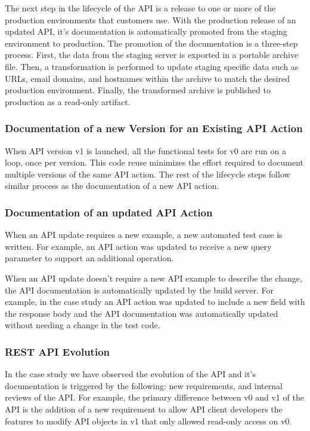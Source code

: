 \documentclass[10pt, conference]{IEEEtran}
\begin{document}
The next step in the lifecycle of the API is a release to one or more of the production environments that customers use. With the production release of an updated API, it's documentation is automatically promoted from the staging environment to production. The promotion of the documentation is a three-step process. First, the data from the staging server is exported in a portable archive file. Then, a transformation is performed to update staging specific data such as URLs, email domains, and hostnames within the archive to match the desired production environment. Finally, the transformed archive is published to production as a read-only artifact.


\subsubsection{Documentation of a new Version for an Existing API Action}

When API version v1 is launched, all the functional tests for v0 are run on a loop, once per version. This code reuse minimizes the effort required to document multiple versions of the same API action. The rest of the lifecycle steps follow similar process as the documentation of a new API action.

\subsubsection{Documentation of an updated API Action}
When an API update requires a new example, a new automated test case is written. For example, an API action was updated to receive a new query parameter to support an additional operation.

When an API update doesn't require a new API example to describe the change, the API documentation is automatically updated by the build server. For example, in the case study an API action was updated to include a new field with the response body and the API documentation was automatically updated without needing a change in the test code.

\subsubsection{REST API Evolution} %
\label{sub:rest_api_evolution}
In the case study we have observed the evolution of the API and it's documentation is triggered by the following: new requirements, and internal reviews of the API. For example, the primary difference between v0 and v1 of the API is the addition of a new requirement to allow API client developers the features to modify API objects in v1 that only allowed read-only access on v0.
\end{document}

